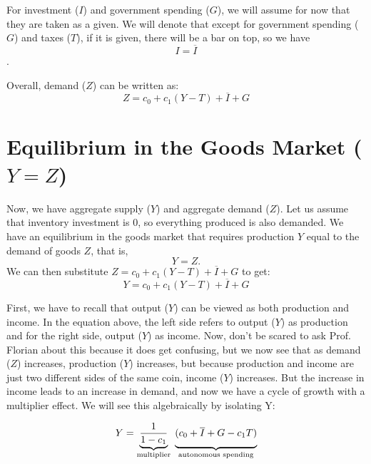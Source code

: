 \documentclass{extarticle}
\begin{document}
For investment ($I$) and government spending ($G$), we will assume for now that they are taken as a given. We will denote that except for government spending ($G$) and taxes ($T$), if it is given, there will be a bar on top, so we have 
$$I = \overline{I}$$.

\noindent Overall, demand ($Z$) can be written as:
$$Z = c_0 + c_1(Y-T) + \overline{I} + G$$

\section{Equilibrium in the Goods Market ($Y = Z$)}
Now, we have aggregate supply ($Y$) and aggregate demand ($Z$). Let us assume that inventory investment is 0, so everything produced is also demanded. We have an equilibrium in the goods market that requires production $Y$ equal to the demand of goods $Z$, that is, $$Y = Z.$$
We can then substitute $Z = c_0 + c_1(Y-T) + \overline{I} + G$ to get:
$$Y = c_0 + c_1(Y-T) + \overline{I} + G$$

\noindent First, we have to recall that output ($Y$) can be viewed as both production and income. In the equation above, the left side refers to output ($Y$) as production and for the right side, output ($Y$) as income. Now, don't be scared to ask Prof. Florian about this because it does get confusing, but we now see that as demand ($Z$) increases, production ($Y$) increases, but because production and income are just two different sides of the same coin, income ($Y$) increases. But the increase in income leads to an increase in demand, and now we have a cycle of growth with a multiplier effect. We will see this algebraically by isolating Y:

$$
Y = \underbrace{\frac{1}{1 - c_1}}_{\text{multiplier}}
    \;\underbrace{(c_0 + \overline{I} + G - c_1 T)\vphantom{\frac{1}{1-c_1}}}_{\text{autonomous spending}}
$$
\end{document}
